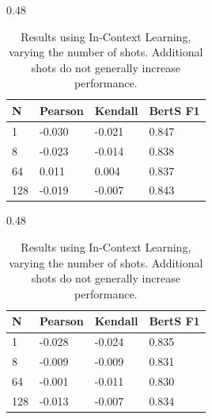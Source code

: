 \begin{table}[h!]
\begin{subtable}[t]{0.48\textwidth}
\centering
\begin{tabular}{l|lll}
\textbf{N} & \textbf{Pearson} & \textbf{Kendall} & \textbf{BertS F1} \\ \hline
1 & -0.030 & -0.021 & 0.847 \\
8 & -0.023 & -0.014 & 0.838 \\
64 & 0.011 & 0.004 & 0.837 \\
128 & -0.019 & -0.007 & 0.843 \\
\end{tabular}
\caption{PLOS}
\label{tab:icl-mini-plos}
\end{subtable}
\hfill
\begin{subtable}[t]{0.48\textwidth}
\centering
\begin{tabular}{l|lll}
\textbf{N} & \textbf{Pearson} & \textbf{Kendall} & \textbf{BertS F1} \\ \hline
1 & -0.028 & -0.024 & 0.835 \\
8 & -0.009 & -0.009 & 0.831 \\
64 & -0.001 & -0.011 & 0.830 \\
128 & -0.013 & -0.007 & 0.834 \\
\end{tabular}
\caption{SciNews}
\label{tab:icl-mini-scinews}
\end{subtable}
\caption[Results using In-Context Learning, varying the number of shots.]{Results using In-Context Learning, varying the number of shots. Additional shots do not generally increase performance.}
\label{tab:icl-mini}
\end{table}
